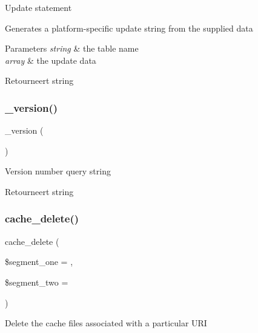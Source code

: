 Update statement

Generates a platform-\/specific update string from the supplied data


\begin{DoxyParams}{Parameters}
{\em string} & the table name \\
\hline
{\em array} & the update data \\
\hline
\end{DoxyParams}
\begin{DoxyReturn}{Retourneert}
string 
\end{DoxyReturn}
\mbox{\label{class_c_i___d_b__driver_ac997a462bb342f97f414910f0e033fb6}} 
\subsubsection{\texorpdfstring{\_version()}{\_version()}}
{\footnotesize\ttfamily \+\_\+version (\begin{DoxyParamCaption}{ }\end{DoxyParamCaption})\hspace{0.3cm}{\ttfamily [protected]}}

Version number query string

\begin{DoxyReturn}{Retourneert}
string 
\end{DoxyReturn}
\mbox{\label{class_c_i___d_b__driver_a4ccac0d027f9e49091f98d0acbbff13c}} 
\subsubsection{\texorpdfstring{cache\_delete()}{cache\_delete()}}
{\footnotesize\ttfamily cache\+\_\+delete (\begin{DoxyParamCaption}\item[{}]{\$segment\+\_\+one = {\ttfamily \textquotesingle{}\textquotesingle{}},  }\item[{}]{\$segment\+\_\+two = {\ttfamily \textquotesingle{}\textquotesingle{}} }\end{DoxyParamCaption})}

Delete the cache files associated with a particular U\+RI


